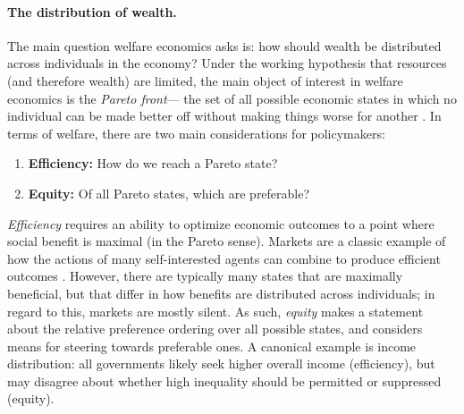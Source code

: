 \paragraph{The distribution of wealth.}
The main question welfare economics asks is:
how should wealth be distributed across individuals in the economy?
Under the working hypothesis that resources (and therefore wealth) are limited,
the main object of interest in welfare economics is the \emph{Pareto front}---%
the set of all possible economic states in which no individual can be made better off without making things worse for another \citep[see, e.g.,][]{johansson1991introduction}.
In terms of welfare, there are two main considerations for policymakers:
\squeeze
\begin{enumerate}[leftmargin=1.7em,topsep=0em,itemsep=0.3em]
\item \textbf{Efficiency:}
How do we reach a Pareto state?

\item \textbf{Equity:}
Of all Pareto states, which are preferable? 
\end{enumerate}
\emph{Efficiency} requires an ability to optimize economic outcomes 
to a point where social benefit is maximal (in the Pareto sense).
Markets are a classic example of how the actions of many self-interested agents can combine to produce  efficient outcomes \citep{arrow1954existence}.
However, there are typically many states 
that are maximally beneficial,
but that differ in how benefits are distributed across individuals;
in regard to this, markets are mostly silent.
As such, \emph{equity} makes a statement about the relative preference ordering over all possible states, and considers means for steering towards preferable ones.
A canonical example is income distribution:
all governments likely seek higher overall income (efficiency),
but may disagree about whether high inequality should be permitted or suppressed
(equity).





